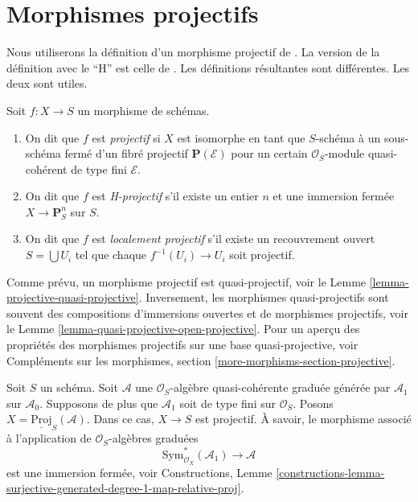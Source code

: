 \section{Morphismes projectifs}
\label{section-projective}

\noindent
Nous utiliserons la définition d'un morphisme projectif de \cite{EGA}. La version
de la définition avec le ``H'' est celle de
\cite{H}. Les définitions résultantes sont différentes. Les deux sont utiles.

\begin{definition}
\label{definition-projective}
Soit $f : X \to S$ un morphisme de schémas.
\begin{enumerate}
\item On dit que $f$ est {\it projectif}
si $X$ est isomorphe en tant que $S$-schéma à
un sous-schéma fermé d'un fibré projectif
$\mathbf{P}(\mathcal{E})$ pour un certain $\mathcal{O}_S$-module quasi-cohérent de type fini $\mathcal{E}$.
\item On dit que $f$ est {\it H-projectif} s'il existe un entier
$n$ et une immersion fermée $X \to \mathbf{P}^n_S$ sur $S$.
\item On dit que $f$ est {\it localement projectif}
s'il existe un recouvrement ouvert $S = \bigcup U_i$ tel que chaque $f^{-1}(U_i) \to U_i$ soit
projectif.
\end{enumerate}
\end{definition}

\noindent
Comme prévu, un morphisme projectif est quasi-projectif,
voir le Lemme \ref{lemma-projective-quasi-projective}. Inversement,
les morphismes quasi-projectifs sont souvent des compositions
d'immersions ouvertes et de morphismes
projectifs, voir le Lemme \ref{lemma-quasi-projective-open-projective}. Pour
un aperçu des propriétés des morphismes projectifs
sur une base quasi-projective,
voir Compléments sur les morphismes, section \ref{more-morphisms-section-projective}.

\begin{example}
\label{example-projective}
Soit $S$ un schéma. Soit $\mathcal{A}$ une $\mathcal{O}_S$-algèbre
quasi-cohérente graduée générée par $\mathcal{A}_1$ sur $\mathcal{A}_0$.
Supposons de plus que $\mathcal{A}_1$ soit de type fini
sur $\mathcal{O}_S$. Posons $X = \underline{\text{Proj}}_S(\mathcal{A})$. Dans ce cas, $X \to S$
est projectif. À savoir, le morphisme
associé à l'application de $\mathcal{O}_S$-algèbres graduées
$$
\text{Sym}_{\mathcal{O}_X}^*(\mathcal{A}_1)
\longrightarrow
\mathcal{A}
$$
est une immersion
fermée,
voir Constructions, Lemme \ref{constructions-lemma-surjective-generated-degree-1-map-relative-proj}.
\end{example}
 
